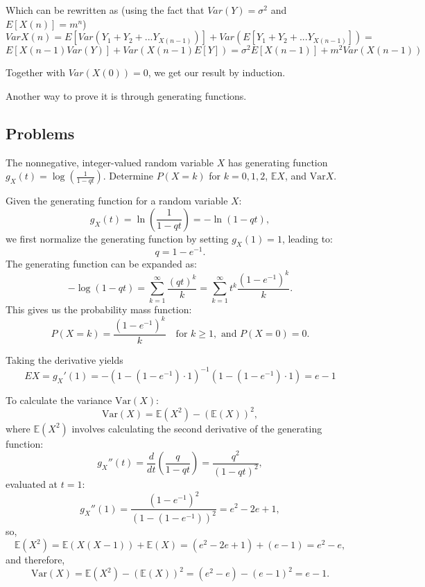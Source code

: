 \begin{enumerate}[label=(\alph*)]
\begin{enumerate}
Which can be rewritten as (using the fact that $Var(Y) = \sigma^2$ and $E[X(n)] = m^n$)
\[
Var X(n) = E[Var(Y_1 + Y_2 + ... Y_{X(n-1)})] + Var(E[Y_1 + Y_2 + ... Y_{X(n-1)}]) =\]
\[
     E[X(n-1)Var(Y)] + Var(X(n-1)E[Y]) = \sigma^2E[X(n-1)] + m^2Var(X(n-1))
      \]

    Together with $Var(X(0)) = 0$, we get our result by induction.

Another way to prove it is through generating functions.


\end{enumerate}


\subsection{Problems}

\problem  %
The nonnegative, integer-valued random variable $X$ has generating function $g_X(t) = \log\left(\frac{1}{1 - qt}\right)$. Determine $P(X = k)$ for $k = 0, 1, 2$, $\mathbb{E}X$, and $\mathrm{Var}X$.


\solution
Given the generating function for a random variable $X$:
\[
g_X(t) = \ln\left(\frac{1}{1 - qt}\right) = -\ln(1-qt),
\]
we first normalize the generating function by setting $g_X(1) = 1$, leading to:
\[
q = 1 - e^{-1}.
\]
The generating function can be expanded as:
\[
-\log(1 - qt) = \sum_{k=1}^\infty \frac{(qt)^k}{k} = \sum_{k=1}^\infty t^k \frac{(1 - e^{-1})^k}{k}.
\]
This gives us the probability mass function:
\[
P(X = k) = \frac{(1 - e^{-1})^k}{k} \quad \text{for } k \geq 1, \text{ and } P(X = 0) = 0.
\]

Taking the derivative yields 
\[
  EX = g_X'(1) = -(1-(1-e^{-1})\cdot1)^{-1}(1-(1-e^{-1})\cdot1) = e-1
\]

To calculate the variance \(\mathrm{Var}(X)\):
\[
\mathrm{Var}(X) = \mathbb{E}(X^2) - (\mathbb{E}(X))^2,
\]
where \(\mathbb{E}(X^2)\) involves calculating the second derivative of the generating function:
\[
g_X''(t) = \frac{d}{dt} \left( \frac{q}{1 - qt} \right) = \frac{q^2}{(1-qt)^2},
\]
evaluated at \(t = 1\):
\[
g_X''(1) = \frac{(1-e^{-1})^2}{(1-(1-e^{-1}))^2} = e^2 - 2e + 1,
\]
so,
\[
\mathbb{E}(X^2) = \mathbb{E}(X(X-1)) + \mathbb{E}(X) = (e^2 - 2e + 1) + (e-1) = e^2 - e,
\]
and therefore,
\[
\mathrm{Var}(X) = \mathbb{E}(X^2) - (\mathbb{E}(X))^2 = (e^2 - e) - (e-1)^2 = e - 1.
\]


\end{enumerate}
